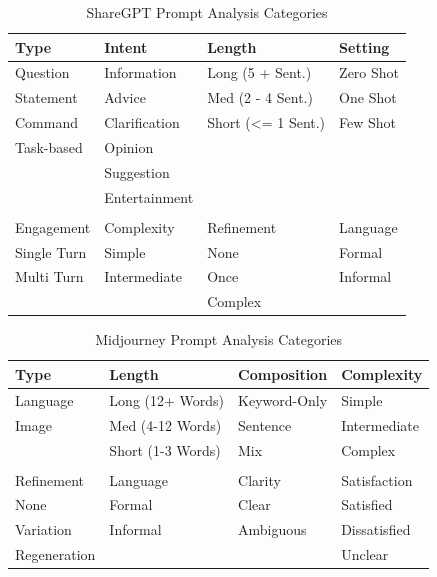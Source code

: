 \begin{table}[]
    \centering
    \caption{ShareGPT Prompt Analysis Categories}
    \begin{tabular}{@{}llll@{}}
        \toprule
        Type        & Intent        & Length             & Setting   \\ \midrule
        Question    & Information   & Long (5 + Sent.)   & Zero Shot \\
        Statement   & Advice        & Med (2 - 4 Sent.)  & One Shot  \\
        Command     & Clarification & Short (<= 1 Sent.) & Few Shot  \\
        Task-based  & Opinion       &                    &           \\
        & Suggestion    &                    &           \\
        & Entertainment &                    &           \\
        &               &                    &           \\
        \toprule
        Engagement  & Complexity    & Refinement         & Language  \\ \midrule
        Single Turn & Simple        & None               & Formal    \\
        Multi Turn  & Intermediate  & Once               & Informal  \\
        &               & Complex            &           \\ \bottomrule
    \end{tabular}
    \label{tab:sharegpt-prompt-analysis-categories}
\end{table}

\begin{table}[]
    \centering
    \caption{Midjourney Prompt Analysis Categories}
    \begin{tabular}{@{}llll@{}}
        \toprule
        Type         & Length            & Composition  & Complexity   \\ \midrule
        Language     & Long (12+ Words)  & Keyword-Only & Simple       \\
        Image        & Med (4-12 Words)  & Sentence     & Intermediate \\
        & Short (1-3 Words) & Mix          & Complex      \\
        \\
        \toprule
        Refinement          & Language & Clarity & Satisfaction \\
        \midrule
        None & Formal & Clear & Satisfied \\
        Variation          & Informal & Ambiguous & Dissatisfied \\
        Regeneration & & & Unclear \\
        \bottomrule
    \end{tabular}
    \label{tab:midjourney-prompt-analysis-categories}
\end{table}

